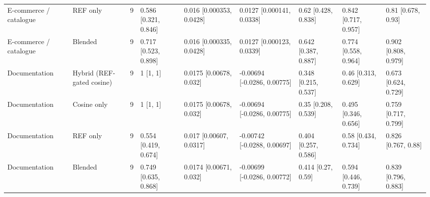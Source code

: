 \begin{table}[t]
{\begin{tabular}{llrllllll}
E-commerce / catalogue & REF only & 9 & 0.586 [0.321, 0.846] & 0.016 [0.000353, 0.0428] & 0.0127 [0.000141, 0.0338] & 0.62 [0.428, 0.838] & 0.842 [0.717, 0.957] & 0.81 [0.678, 0.93] \\
E-commerce / catalogue & Blended & 9 & 0.717 [0.523, 0.898] & 0.016 [0.000335, 0.0428] & 0.0127 [0.000123, 0.0339] & 0.642 [0.387, 0.887] & 0.774 [0.558, 0.964] & 0.902 [0.808, 0.979] \\
Documentation & Hybrid (REF-gated cosine) & 9 & 1 [1, 1] & 0.0175 [0.00678, 0.032] & -0.00694 [-0.0286, 0.00775] & 0.348 [0.215, 0.537] & 0.46 [0.313, 0.629] & 0.673 [0.624, 0.729] \\
Documentation & Cosine only & 9 & 1 [1, 1] & 0.0175 [0.00678, 0.032] & -0.00694 [-0.0286, 0.00775] & 0.35 [0.208, 0.539] & 0.495 [0.346, 0.656] & 0.759 [0.717, 0.799] \\
Documentation & REF only & 9 & 0.554 [0.419, 0.674] & 0.017 [0.00607, 0.0317] & -0.00742 [-0.0288, 0.00697] & 0.404 [0.257, 0.586] & 0.58 [0.434, 0.734] & 0.826 [0.767, 0.88] \\
Documentation & Blended & 9 & 0.749 [0.635, 0.868] & 0.0174 [0.00671, 0.032] & -0.00699 [-0.0286, 0.00772] & 0.414 [0.27, 0.59] & 0.594 [0.446, 0.739] & 0.839 [0.796, 0.883] \\
\bottomrule
\end{tabular}}
\end{table}
